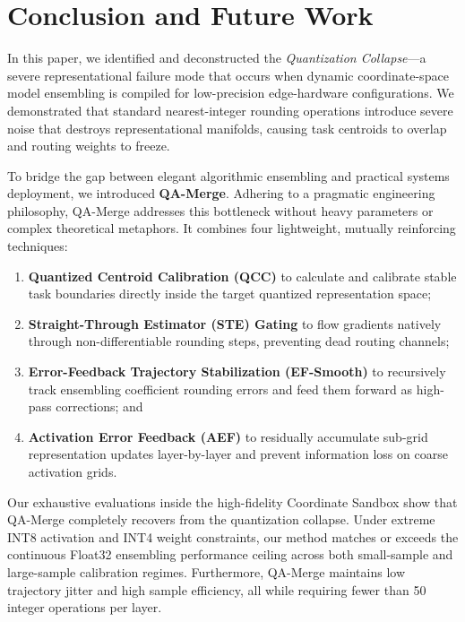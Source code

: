 \section{Conclusion and Future Work}
\label{sec:conclusion}

In this paper, we identified and deconstructed the \emph{Quantization Collapse}—a severe representational failure mode that occurs when dynamic coordinate-space model ensembling is compiled for low-precision edge-hardware configurations. We demonstrated that standard nearest-integer rounding operations introduce severe noise that destroys representational manifolds, causing task centroids to overlap and routing weights to freeze. 

To bridge the gap between elegant algorithmic ensembling and practical systems deployment, we introduced \textbf{QA-Merge}. Adhering to a pragmatic engineering philosophy, QA-Merge addresses this bottleneck without heavy parameters or complex theoretical metaphors. It combines four lightweight, mutually reinforcing techniques:
\begin{enumerate}
    \item \textbf{Quantized Centroid Calibration (QCC)} to calculate and calibrate stable task boundaries directly inside the target quantized representation space;
    \item \textbf{Straight-Through Estimator (STE) Gating} to flow gradients natively through non-differentiable rounding steps, preventing dead routing channels;
    \item \textbf{Error-Feedback Trajectory Stabilization (EF-Smooth)} to recursively track ensembling coefficient rounding errors and feed them forward as high-pass corrections; and
    \item \textbf{Activation Error Feedback (AEF)} to residually accumulate sub-grid representation updates layer-by-layer and prevent information loss on coarse activation grids.
\end{enumerate}

Our exhaustive evaluations inside the high-fidelity Coordinate Sandbox show that QA-Merge completely recovers from the quantization collapse. Under extreme INT8 activation and INT4 weight constraints, our method matches or exceeds the continuous Float32 ensembling performance ceiling across both small-sample and large-sample calibration regimes. Furthermore, QA-Merge maintains low trajectory jitter and high sample efficiency, all while requiring fewer than 50 integer operations per layer.


